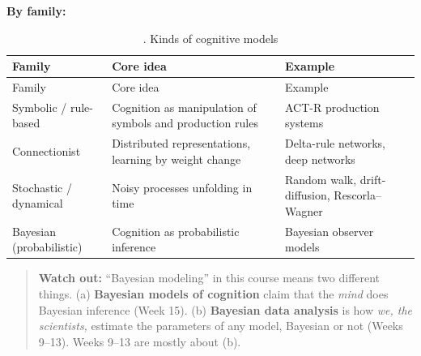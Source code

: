 \textbf{By family:}

\begin{longtable}[]{@{}
  >{\raggedright\arraybackslash}p{}
  >{\raggedright\arraybackslash}p{}
  >{\raggedright\arraybackslash}p{}@{}}
\caption{. Kinds of cognitive models}\tabularnewline
\toprule\noalign{}
\begin{minipage}[b]{\linewidth}\raggedright
Family
\end{minipage} & \begin{minipage}[b]{\linewidth}\raggedright
Core idea
\end{minipage} & \begin{minipage}[b]{\linewidth}\raggedright
Example
\end{minipage} \\
\midrule\noalign{}
\endfirsthead
\toprule\noalign{}
\begin{minipage}[b]{\linewidth}\raggedright
Family
\end{minipage} & \begin{minipage}[b]{\linewidth}\raggedright
Core idea
\end{minipage} & \begin{minipage}[b]{\linewidth}\raggedright
Example
\end{minipage} \\
\midrule\noalign{}
\endhead
\bottomrule\noalign{}
\endlastfoot
Symbolic / rule-based & Cognition as manipulation of symbols and
production rules & ACT-R production systems \\
Connectionist & Distributed representations, learning by weight change &
Delta-rule networks, deep networks \\
Stochastic / dynamical & Noisy processes unfolding in time & Random
walk, drift-diffusion, Rescorla--Wagner \\
Bayesian (probabilistic) & Cognition as probabilistic inference &
Bayesian observer models \\
\end{longtable}

\begin{quote}
\textbf{Watch out:} ``Bayesian modeling'' in this course means two
different things. (a) \textbf{Bayesian models of cognition} claim that
the \emph{mind} does Bayesian inference (Week 15). (b) \textbf{Bayesian
data analysis} is how \emph{we, the scientists,} estimate the parameters
of any model, Bayesian or not (Weeks 9--13). Weeks 9--13 are mostly
about (b).
\end{quote}

